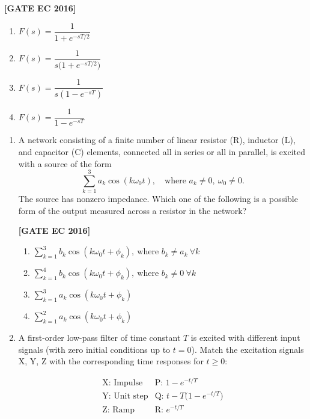 \documentclass[12pt]{article}
\begin{document}
\begin{enumerate}[label=\textbf{Q.\arabic*.}, start=6, itemsep=2em]
\begin{enumerate}[label=\textbf{Q.\arabic*.}, start=26]
\noindent \textbf{[GATE EC 2016]}

\begin{multicols}{2}
\begin{enumerate}[label=\alph*.]
    \item \(F(s)=\dfrac{1}{1+e^{-sT/2}}\)
    \item \(F(s)=\dfrac{1}{s\big(1+e^{-sT/2}\big)}\)
    \item \(F(s)=\dfrac{1}{s(1-e^{-sT})}\)
    \item \(F(s)=\dfrac{1}{1-e^{-sT}}\)
\end{enumerate}
\end{multicols}

\begin{enumerate}[label=\textbf{Q.\arabic*.}, start=31]

\item A network consisting of a finite number of linear resistor (R), inductor (L), and capacitor (C)
elements, connected all in series or all in parallel, is excited with a source of the form
\[
\sum_{k=1}^{3} a_k\cos(k\omega_0 t),\quad\text{where } a_k\neq 0,\ \omega_0\neq 0.
\]
The source has nonzero impedance. Which one of the following is a possible form of the output
measured across a resistor in the network?

\noindent \textbf{[GATE EC 2016]}

\begin{multicols}{2}
\begin{enumerate}[label=\alph*.]
    \item $\displaystyle \sum_{k=1}^{3} b_k\cos(k\omega_0 t + \phi_k),\ \text{where } b_k \neq a_k\ \forall k$
    \item $\displaystyle \sum_{k=1}^{4} b_k\cos(k\omega_0 t + \phi_k),\ \text{where } b_k \neq 0\ \forall k$
    \item $\displaystyle \sum_{k=1}^{3} a_k\cos(k\omega_0 t + \phi_k)$
    \item $\displaystyle \sum_{k=1}^{2} a_k\cos(k\omega_0 t + \phi_k)$
\end{enumerate}
\end{multicols}

\item A first-order low-pass filter of time constant $T$ is excited with different input signals (with zero initial conditions up to $t=0$). Match the excitation signals X, Y, Z with the corresponding time responses for $t\ge0$:

\[
\begin{array}{ll}
\text{X: Impulse} & \text{P: }1-e^{-t/T} \\
\text{Y: Unit step} & \text{Q: }t - T\big(1-e^{-t/T}\big) \\
\text{Z: Ramp} & \text{R: }e^{-t/T}
\end{array}
\]


\end{enumerate}
\end{enumerate}
\end{enumerate}
\end{document}
